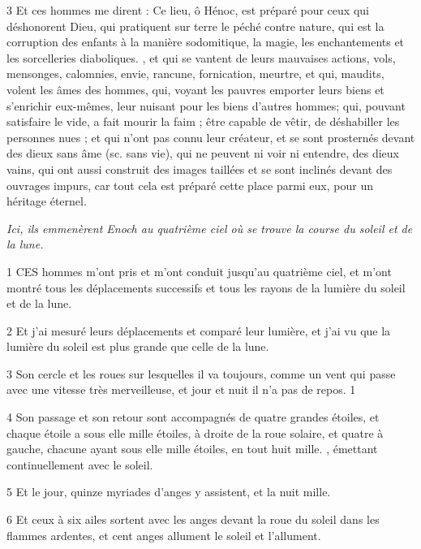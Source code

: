 \par 3 Et ces hommes me dirent : Ce lieu, ô Hénoc, est préparé pour ceux qui déshonorent Dieu, qui pratiquent sur terre le péché contre nature, qui est la corruption des enfants à la manière sodomitique, la magie, les enchantements et les sorcelleries diaboliques. , et qui se vantent de leurs mauvaises actions, vols, mensonges, calomnies, envie, rancune, fornication, meurtre, et qui, maudits, volent les âmes des hommes, qui, voyant les pauvres emporter leurs biens et s'enrichir eux-mêmes, leur nuisant pour les biens d'autres hommes; qui, pouvant satisfaire le vide, a fait mourir la faim ; être capable de vêtir, de déshabiller les personnes nues ; et qui n'ont pas connu leur créateur, et se sont prosternés devant des dieux sans âme (sc. sans vie), qui ne peuvent ni voir ni entendre, des dieux vains, qui ont aussi construit des images taillées et se sont inclinés devant des ouvrages impurs, car tout cela est préparé cette place parmi eux, pour un héritage éternel.


\par \textit{Ici, ils emmenèrent Enoch au quatrième ciel où se trouve la course du soleil et de la lune.}

\par 1 CES hommes m'ont pris et m'ont conduit jusqu'au quatrième ciel, et m'ont montré tous les déplacements successifs et tous les rayons de la lumière du soleil et de la lune.

\par 2 Et j'ai mesuré leurs déplacements et comparé leur lumière, et j'ai vu que la lumière du soleil est plus grande que celle de la lune.

\par 3 Son cercle et les roues sur lesquelles il va toujours, comme un vent qui passe avec une vitesse très merveilleuse, et jour et nuit il n'a pas de repos. 1

\par 4 Son passage et son retour sont accompagnés de quatre grandes étoiles, et chaque étoile a sous elle mille étoiles, à droite de la roue solaire, et quatre à gauche, chacune ayant sous elle mille étoiles, en tout huit mille. , émettant continuellement avec le soleil.

\par 5 Et le jour, quinze myriades d'anges y assistent, et la nuit mille.

\par 6 Et ceux à six ailes sortent avec les anges devant la roue du soleil dans les flammes ardentes, et cent anges allument le soleil et l'allument.

